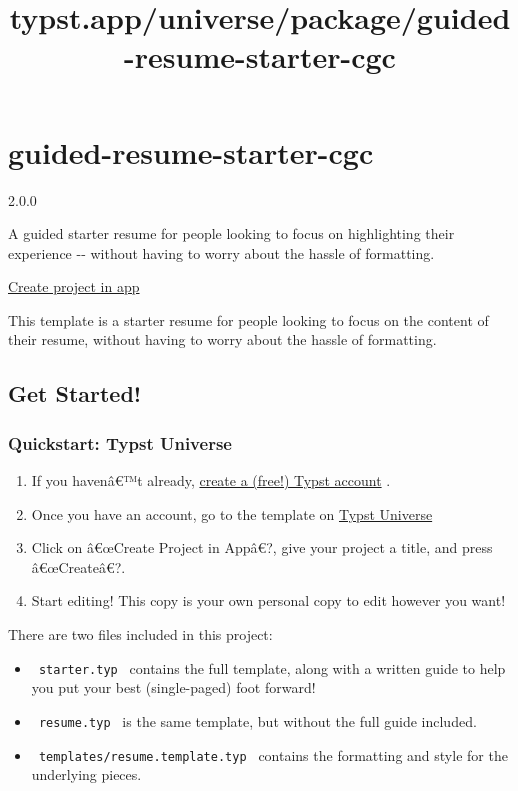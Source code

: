 \title{typst.app/universe/package/guided-resume-starter-cgc}

\label{banner}
\label{template-thumbnail}

\section{guided-resume-starter-cgc}\label{guided-resume-starter-cgc}

{ 2.0.0 }

A guided starter resume for people looking to focus on highlighting
their experience -\/- without having to worry about the hassle of
formatting.

\href{/app?template=guided-resume-starter-cgc&version=2.0.0}{Create
project in app}

\label{readme}
This template is a starter resume for people looking to focus on the
content of their resume, without having to worry about the hassle of
formatting.

\subsection{Get Started!}\label{get-started}

\subsubsection{Quickstart: Typst
Universe}\label{quickstart-typst-universe}

\begin{enumerate}
\tightlist
\item
  If you havenâ€™t already, \href{https://typst.app/}{create a (free!)
  Typst account} .
\item
  Once you have an account, go to the template on
  \href{https://typst.app/universe/package/resume-starter-cgc}{Typst
  Universe}
\item
  Click on â€œCreate Project in Appâ€?, give your project a title, and
  press â€œCreateâ€?.
\item
  Start editing! This copy is your own personal copy to edit however you
  want!
\end{enumerate}

There are two files included in this project:

\begin{itemize}
\tightlist
\item
  \texttt{\ starter.typ\ } contains the full template, along with a
  written guide to help you put your best (single-paged) foot forward!
\item
  \texttt{\ resume.typ\ } is the same template, but without the full
  guide included.
\item
  \texttt{\ templates/resume.template.typ\ } contains the formatting and
  style for the underlying pieces.
\end{itemize}

